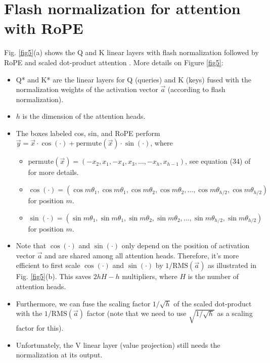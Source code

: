 \documentclass{article}
\def\rms{\text{RMS}(\vec{a})}         %
\def\a{\vec{a}}                       %
\def\vx{\vec{x}}                      %
\def\vy{\vec{y}}                      %
\def\cosi{\cos{(\cdot)}}              %
\def\sini{\sin{(\cdot)}}              %
\begin{document}
\section{Flash normalization for attention with RoPE}
Fig. \ref{fig5}(a) shows the Q and K linear layers with flash normalization followed by RoPE \citep{RoPE} and scaled dot-product attention \citep{vanilla}. More details on Figure \ref{fig5}:
\begin{itemize}[topsep=-1pt]
  \item Q* and K* are the linear layers for Q (queries) and K (keys) fused with the normalization weights of the activation vector $\a$ (according to flash normalization).
  \item $h$ is the dimension of the attention heads.
  \item The boxes labeled cos, sin, and RoPE perform $\vy = \vx \cdot \cosi + \text{permute}(\vx) \cdot \sini$, where
  \begin{itemize}[topsep=-1pt]
    \item $\text{permute}(\vx) = (-x_2, x_1, -x_4, x_3, \dots, -x_h, x_{h-1})$, see equation (34) of \citep{RoPE} for more details.
    \item $\cosi = (\cos m \theta_1, \cos m \theta_1, \cos m \theta_2, \cos m \theta_2, \dots, \cos m \theta_{h/2}, \cos m \theta_{h/2})$ for position $m$.
    \item $\sini = (\sin m \theta_1, \sin m \theta_1, \sin m \theta_2, \sin m \theta_2, \dots, \sin m \theta_{h/2}, \sin m \theta_{h/2})$ for position $m$.
  \end{itemize}
  \item Note that $\cosi$ and $\sini$ only depend on the position of activation vector $\a$ and are shared among all attention heads. Therefore, it’s more efficient to first scale $\cosi$ and $\sini$ by $1/ \rms$ as illustrated in Fig. \ref{fig5}(b). This saves $2hH - h$ multipliers, where $H$ is the number of attention heads.
  \item Furthermore, we can fuse the scaling factor $1/ \sqrt{h}$ of the scaled dot-product with the $1/ \rms$ factor (note that we need to use $\sqrt{1/ \sqrt{h}}$ as a scaling factor for this).
  \item Unfortunately, the V linear layer (value projection) still needs the normalization at its output.
\end{itemize}
\end{document}
